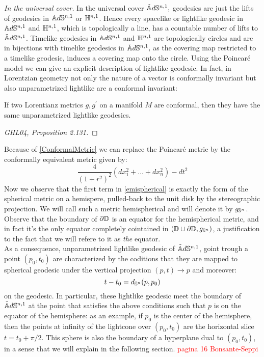 \textit{In the universal cover.} In the universal cover $\AS^{n,1},$ geodesics are just the lifts of geodesics in $\A^{n,1}$ or $\H^{n,1}$. Hence every spacelike or lightlike geodesic in $\A^{n,1}$ and $\H^{n,1}$, which is topologically a line, has a countable number of lifts to $\AS^{n,1}$. Timelike geodesics in $\A^{n,1}$ and $\H^{n,1}$ are topologically circles and are in bijections with timelike geodesics in $\AS^{n,1},$ as the covering map restricted to a timelike geodesic, induces a covering map onto the circle. Using the Poincaré model we can give an explicit description of lightlike geodesic. In fact, in Lorentzian geometry not only the nature of a vector is conformally invariant but also unparametrized lightlike are a conformal invariant: 
\begin{theorem}\label{ConformalMetric} If two Lorentianz metrics $g,g^{\prime} $ on a manifold $M$ are conformal, then they have the same unparametrized lightlike geodesics.
\end{theorem}
\begin{proof}
    [GHL04, Proposition 2.131]
\end{proof}
Because of \ref{ConformalMetric} we can replace the Poincaré metric by the conformally equivalent metric given by:
\begin{equation}\label{emispherical}
    \frac{4}{(1+r^2)^2}(dx_1^2+\dots+dx_n^2)-dt^2
\end{equation} 
Now we observe that the first term in \ref{emispherical} is exactly the form of the spherical metric on a hemispere, pulled-back to the unit disk by the stereographic projection. We will call such a metric hemispherical and will denote it by $g_{\S^n}$. Observe that the boundary of $\partial\D$ is an equator for the hemispherical metric, and in fact it's the only equator completely cointained in $(\D\cup\partial\D,g_{\S^n})$, a justification to the fact that we will refere to it as \textit{the} equator.\\
As a consequence, unparametrized lightlike geodesic of $\AS^{n,1}$, goint trough a point $(p_0,t_0)$ are characterized by the coditions that they are mapped to spherical geodesic under the vertical projection $(p,t)\to p$ and moreover: 
\[
    t-t_0=d_{\S^n}(p,p_0)
\] on the geodesic.  In particular, these lightlike geodesic meet the boundary of $\AS^{n,1}$ at the point that satisfies the above conditions such that $p$ is on the equator of the hemisphere: as an example, if $p_0$ is the center of the hemisphere, then the points at infinity of the lightcone over $(p_0,t_0)$ are the horizontal slice $t=t_{0}+\pi/2.$ This sphere is also the boundary of a hyperplane dual to $(p_0,t_0)$, in a sense that we will explain in the following section. 
\textcolor{red}{pagina 16 Bonsante-Seppi}   
